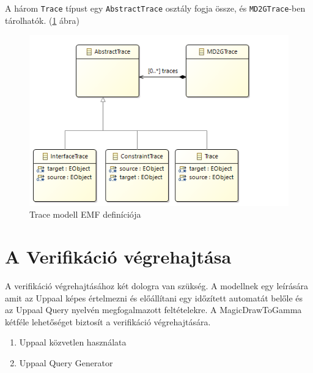 A három \verb+Trace+ típust egy \verb+AbstractTrace+ osztály fogja össze, és \verb+MD2GTrace+-ben tárolhatók. (\ref{fig:trace-model} ábra)

\begin{figure}[ht]
	\centering
	\includegraphics[keepaspectratio, width=140mm]{figures/trace-model.png}
	\caption{Trace modell EMF definíciója}
	\label{fig:trace-model}
\end{figure}


\section{A Verifikáció végrehajtása}
A verifikáció végrehajtásához két dologra van szükség. A modellnek egy leírására amit az Uppaal képes értelmezni és előállítani egy időzített automatát belőle és az Uppaal Query nyelvén megfogalmazott feltételekre. A MagicDrawToGamma kétféle lehetőséget biztosít a verifikáció végrehajtására.

\begin{enumerate}
	\item Uppaal közvetlen használata
	\item Uppaal Query Generator
	\label{en:fels}
\end{enumerate}

